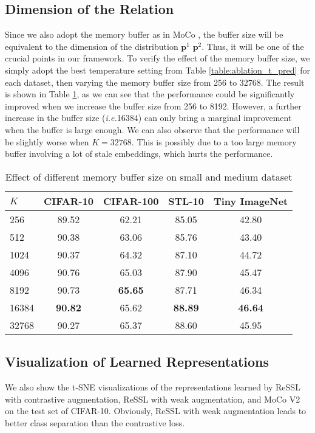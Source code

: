 \documentclass{article}
\newcommand{\<}{\left\langle}
\renewcommand{\>}{\right\rangle}
\newcommand{\ie}{{\emph{i.e.}}}
\begin{document}
\subsection{Dimension of the Relation}
Since we also adopt the memory buffer as in MoCo \cite{moco}, the buffer size will be equivalent to the dimension of the distribution $\mathbf{p}^1$ $\mathbf{p}^2$. Thus, it will be one of the crucial points in our framework. To verify the effect of the memory buffer size, we simply adopt the best temperature setting from Table \ref{table:ablation_t_pred} for each dataset, then varying the memory buffer size from 256 to 32768. The result is shown in Table \ref{table:ablation_buffer}, as we can see that the performance could be significantly improved when we increase the buffer size from 256 to 8192. However, a further increase in the buffer size (\ie 16384) can only bring a marginal improvement when the buffer is large enough. We can also observe that the performance will be slightly worse when $K=32768$. This is possibly due to a too large memory buffer involving a lot of stale embeddings, which hurts the performance.
\renewcommand\arraystretch{1.0}
\begin{table}[h]
 \centering
 \caption{Effect of different memory buffer size on small and medium dataset}
 \vspace{-10pt}
 \label{table:ablation_buffer}
\begin{tabular}{l c c c c} 
\toprule 
$K$ & CIFAR-10 & CIFAR-100 & STL-10 & Tiny ImageNet \\ \hline
256   & 89.52 & 62.21 & 85.05  & 42.80 \\
512   & 90.38 & 63.06 & 85.76  & 43.40 \\
1024  & 90.37 & 64.32 & 87.10  & 44.72 \\
4096  & 90.76 & 65.03 & 87.90  & 45.47 \\
8192  & 90.73 & \textbf{65.65} & 87.71  & 46.34 \\
16384 & \textbf{90.82}  & 65.62 & \textbf{88.89}  & \textbf{46.64} \\
32768 & 90.27 & 65.37 & 88.60  & 45.95 \\
\bottomrule 
\end{tabular}
\vspace{-10pt}
\end{table}




\subsection{Visualization of Learned Representations}
We also show the t-SNE \cite{tsne} visualizations of the representations learned by ReSSL with contrastive augmentation, ReSSL with weak augmentation, and MoCo V2 on the test set of CIFAR-10. Obviously, ReSSL with weak augmentation leads to better class separation than the contrastive loss.
\end{document}
